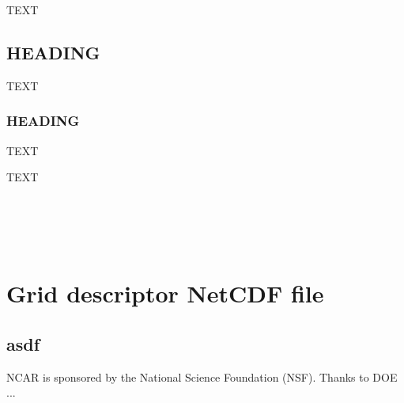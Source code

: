 \documentclass[gmd]{copernicus}
\begin{document}
TEXT

\subsection{HEADING}
TEXT

\subsubsection{HEADING}
TEXT




\conclusions  %
TEXT




\appendix
\section{\\ \\ \hspace*{-7mm} Grid descriptor NetCDF file}    %

\subsection{asdf}                               %




\begin{acknowledgements}
NCAR is sponsored by the National Science Foundation (NSF). Thanks to DOE ...
\end{acknowledgements}






%
%
%
%


\end{document}
